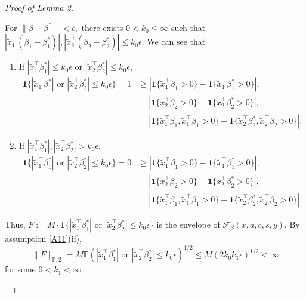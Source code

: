 \documentclass{article}
\begin{document}
\begin{proof}[Proof of Lemma 2]
\begin{enumerate}
		For $\|\beta - \beta^*\| < \epsilon,$ there exists $0 < k_0 \le \infty$ such that $|\tilde x_1^\intercal (\beta_1 - \beta_1^*)|, |\tilde x_2^\intercal (\beta_2 - \beta_2^*)| \le k_0\epsilon.$ We can see that
		\begin{enumerate}
		\item[(a)] If $|\tilde x_1^\intercal\beta_1^*| \le k_0\epsilon$ or  $|\tilde x_2^\intercal \beta_2^*| \le k_0\epsilon$,
		\begin{align*}
			\mathbf1\{ |\tilde x_1^\intercal\beta_1^*| \text{ or } |\tilde x_2^\intercal \beta_2^*| \le k_0\epsilon \} 
			= 1 &\ge 
			|\mathbf1\{ \tilde x_1^\intercal\beta_1  > 0\} - \mathbf1\{ \tilde x_1^\intercal\beta_1^* > 0\}|,\\
			&\quad\; |\mathbf1\{ \tilde x_2^\intercal\beta_2 > 0\} - \mathbf1\{ \tilde x_2^\intercal\beta_2^* > 0\}|, \\
			&\quad\; |\mathbf1\{ \tilde x_1^\intercal\beta_1, \tilde x_1^\intercal\beta_1 > 0 \} - \mathbf1\{ \tilde x_2^\intercal\beta_2^*, \tilde x_2^\intercal\beta_2 > 0 \}|.
		\end{align*}
		
		\item[(b)] If $|\tilde x_1^\intercal\beta_1^*|, |\tilde x_2^\intercal \beta_2^*| > k_0\epsilon$,
		\begin{align*}
			\mathbf1\{ |\tilde x_1^\intercal\beta_1^*| \text{ or } |\tilde x_2^\intercal \beta_2^*| \le k_0\epsilon \} 
			= 0 &\ge 
			|\mathbf1\{ \tilde x_1^\intercal\beta_1  > 0\} - \mathbf1\{ \tilde x_1^\intercal\beta_1^* > 0\}|,\\
			&\quad\; |\mathbf1\{ \tilde x_2^\intercal\beta_2 > 0\} - \mathbf1\{ \tilde x_2^\intercal\beta_2^* > 0\}|, \\
			&\quad\; |\mathbf1\{ \tilde x_1^\intercal\beta_1, \tilde x_1^\intercal\beta_1 > 0 \} - \mathbf1\{ \tilde x_2^\intercal\beta_2^*, \tilde x_2^\intercal\beta_2 > 0 \}|.
		\end{align*}
		\end{enumerate}
		
		Thus, $F := M \cdot \mathbf1\{ |\tilde x_1^\intercal\beta_1^*| \text{ or } |\tilde x_2^\intercal \beta_2^*| \le k_0\epsilon \}$ is the envelope of $\mathcal F_{\beta}(\bar x, \bar a, \bar c, \bar s, \bar y).$
		By assumption \ref{A11}(ii), 
		\[
		\|F\|_{\mathbb P,2} = M \mathbb P\left( |\tilde x_1^\intercal\beta_1^*| \text{ or } |\tilde x_2^\intercal\beta_2^*| \le k_0\epsilon \right)^{1/2} \le M(2k_0k_1\epsilon)^{1/2} < \infty
		\]
		for some $0 < k_1 < \infty.$
		

\end{enumerate}
\end{proof}
\end{document}
